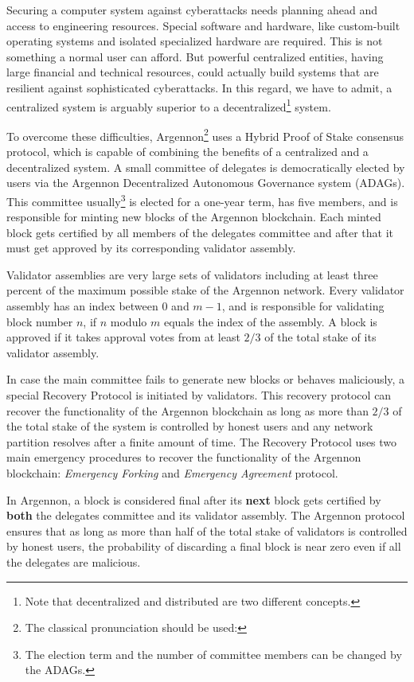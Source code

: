 Securing a computer system against cyberattacks needs planning ahead and access to engineering resources.
Special software and hardware, like custom-built operating systems and isolated specialized hardware are required.
This is not something a normal user can afford. But powerful centralized entities, having large financial and
technical resources, could actually build
systems that are resilient against sophisticated cyberattacks. In this regard, we have to admit, a centralized system is
arguably superior to a decentralized\footnote{Note that decentralized and distributed are two different concepts.}
system.

To overcome these difficulties, Argennon\footnote{The classical pronunciation should be used:}
uses a Hybrid Proof of Stake consensus protocol, which is
capable of combining the benefits of a centralized and a decentralized system. A small committee of
delegates is democratically elected by users via the Argennon Decentralized Autonomous Governance system
(ADAGs). This committee usually\footnote{The election term and the number of committee members can be changed by the
ADAGs.} is elected for a one-year term, has five members, and is responsible for minting new
blocks of the Argennon blockchain.
Each minted block gets certified by all members of the delegates committee and after that it must get approved
by its corresponding validator assembly.

Validator assemblies are very
large sets of validators including at least three percent of the maximum possible stake of the Argennon network.
Every validator assembly has an index between $0$ and $m - 1$, and is responsible for validating block number $n$,
if $n$ modulo $m$ equals the index of the assembly. A block is approved if it takes approval votes from at
least $2/3$ of the total stake of its validator assembly.

In case the main committee fails to generate new blocks or behaves maliciously, a special Recovery Protocol is
initiated by validators.
This recovery protocol can recover the functionality
of the Argennon blockchain as long as more than $2/3$ of the total stake of the system is controlled by honest users
and any network partition resolves after a finite amount of time. The Recovery Protocol uses two main emergency
procedures to recover the functionality of the Argennon blockchain: \emph{Emergency Forking} and \emph{Emergency
Agreement} protocol.

In Argennon, a block is considered final after its \textbf{next} block gets certified by \textbf{both} the
delegates committee and its validator assembly.
The Argennon protocol ensures that as long as more than half of the total stake of validators is
controlled by honest users, the probability of discarding a final block is near zero even if all the delegates are
malicious.

